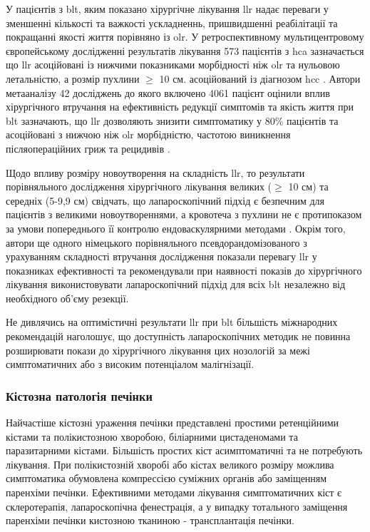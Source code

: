 \begin{refsection}
\begin{figure}[!ht]
\end{figure}


У пацієнтів з \acrshort{blt}, яким показано хірургічне лікування \acrshort{llr} надає переваги у зменшенні кількості та важкості ускладненнь, пришвидшенні реабілітації та покращанні якості життя порівняно із \acrshort{olr}. У ретроспективному мультицентровому європейському дослідженні результатів лікування 573 пацієнтів з \acrshort{hca} зазначається що \acrshort{llr} асоційовані із нижчими показниками морбідності ніж \acrshort{olr} та нульовою летальністю, а розмір пухлини $\geq$ 10 см. асоційований із діагнозом \acrshort{hcc} \cite{Laurent2016}. Автори метааналізу 42 досліджень до якого включено 4061 пацієнт оцінили вплив хірургічного втручання на ефективність редукції симптомів та якість життя при \acrshort{blt} зазначають, що \acrshort{llr} дозволяють знизити симптоматику у 80\% пацієнтів та асоційовані з нижчою ніж \acrshort{olr} морбідністю, частотою виникнення післяопераційних гриж та рецидивів \cite{VanRosmalen2019}. 

Щодо впливу розміру новоутворення на складність \acrshort{llr}, то результати порівняльного дослідження хірургічного лікування великих ($\geq$ 10 см) та середніх (5-9,9 см) свідчать, що лапароскопічний підхід є безпечним для пацієнтів з великими новоутвореннями, а кровотеча з пухлини не є протипоказом за умови попереднього її контролю ендоваскулярними методами \cite{McKay2020}. Окрім того, автори ще одного німецького порівняльного псевдорандомізованого з урахуванням складності втручання дослідження показали перевагу \acrshort{llr} у показниках ефективності та рекомендували при наявності показів до хірургічного лікування виконистовувати лапароскопічний підхід для всіх \acrshort{blt} незалежно від необхідного об'єму резекції.

Не дивлячись на оптимістичні результати \acrshort{llr} при \acrshort{blt} більшість міжнародних рекомендацій наголошує, що доступність лапароскопічних методик не повинна розширювати покази до хірургічного лікування цих нозологій за межі симптоматичних або з високим потенціалом малігнізації.

\subsubsection{Кістозна патологія печінки}

Найчастіше кістозні ураження печінки представлені простими ретенційними кістами та полікистозною хворобою, біліарними цистаденомами та паразитарними кістами. Більшість простих кіст асимптоматичні та не потребують лікування. При полікистозній хворобі або кістах великого розміру можлива симптоматика обумовлена компрессією суміжних органів або заміщенням паренхіми печінки. Ефективними методами лікування симптоматичних кіст є склеротерапія, лапароскопічна фенестрація, а у випадку тотального заміщення паренхіми печінки кистозною тканиною - трансплантація печінки. 


\end{refsection}
